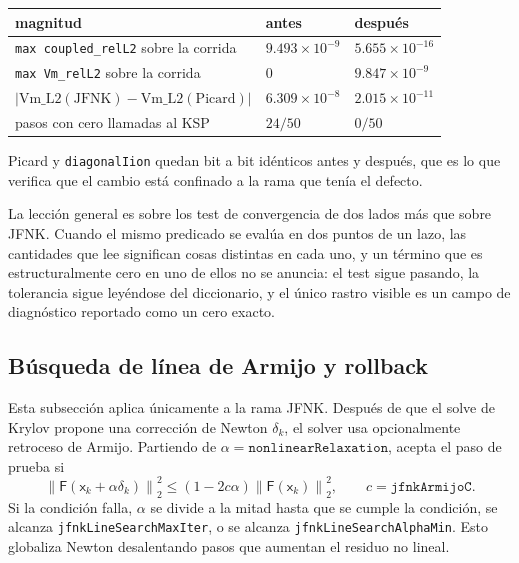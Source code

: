 \documentclass[11pt,a4paper]{article}
\newcommand{\code}[1]{\texttt{\small #1}}
\newcommand{\Fres}{\mathsf{F}}
\newcommand{\norm}[1]{\left\lVert #1 \right\rVert}
\begin{document}
\begin{center}
\begin{tabular}{lll}
\toprule
magnitud & antes & después \\
\midrule
\code{max coupled\_relL2} sobre la corrida & $9.493\times10^{-9}$ & $5.655\times10^{-16}$ \\
\code{max Vm\_relL2} sobre la corrida & $0$ & $9.847\times10^{-9}$ \\
$|\text{Vm\_L2}(\text{JFNK})-\text{Vm\_L2}(\text{Picard})|$ & $6.309\times10^{-8}$ & $2.015\times10^{-11}$ \\
pasos con cero llamadas al KSP & $24/50$ & $0/50$ \\
\bottomrule
\end{tabular}
\end{center}

Picard y \code{diagonalIion} quedan bit a bit idénticos antes y después, que es lo que verifica que el cambio está confinado a la rama que tenía el defecto.

La lección general es sobre los test de convergencia de dos lados más que sobre JFNK. Cuando el mismo predicado se evalúa en dos puntos de un lazo, las cantidades que lee significan cosas distintas en cada uno, y un término que es estructuralmente cero en uno de ellos no se anuncia: el test sigue pasando, la tolerancia sigue leyéndose del diccionario, y el único rastro visible es un campo de diagnóstico reportado como un cero exacto.

\subsection{Búsqueda de línea de Armijo y rollback}
\label{sec:rollback}

Esta subsección aplica únicamente a la rama JFNK. Después de que el solve de Krylov propone una corrección de Newton $\delta_k$, el solver usa
opcionalmente retroceso de Armijo. Partiendo de $\alpha=\texttt{nonlinearRelaxation}$, acepta
el paso de prueba si
\begin{equation}
  \norm{\Fres(\mathsf{x}_k+\alpha\delta_k)}_2^2
  \le
  \left(1-2c\alpha\right)
  \norm{\Fres(\mathsf{x}_k)}_2^2,
  \qquad c=\texttt{jfnkArmijoC}.
  \label{eq:armijo}
\end{equation}
Si la condición falla, $\alpha$ se divide a la mitad hasta que se cumple la condición, se
alcanza \code{jfnkLineSearchMaxIter}, o se alcanza \code{jfnkLineSearchAlphaMin}. Esto
globaliza Newton desalentando pasos que aumentan el residuo no lineal.
\end{document}
